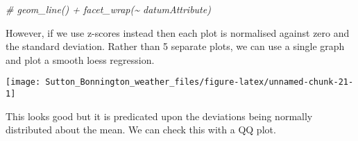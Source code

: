 \documentclass{article}
\newenvironment{Shaded}{\begin{snugshade}}{\end{snugshade}}
\newcommand{\AttributeTok}[1]{\textcolor[rgb]{0.77,0.63,0.00}{#1}}
\newcommand{\CommentTok}[1]{\textcolor[rgb]{0.56,0.35,0.01}{\textit{#1}}}
\newcommand{\ConstantTok}[1]{\textcolor[rgb]{0.00,0.00,0.00}{#1}}
\newcommand{\FunctionTok}[1]{\textcolor[rgb]{0.00,0.00,0.00}{#1}}
\newcommand{\NormalTok}[1]{#1}
\newcommand{\OtherTok}[1]{\textcolor[rgb]{0.56,0.35,0.01}{#1}}
\newcommand{\SpecialCharTok}[1]{\textcolor[rgb]{0.00,0.00,0.00}{#1}}
\newcommand{\StringTok}[1]{\textcolor[rgb]{0.31,0.60,0.02}{#1}}
\begin{document}
\begin{Shaded}
\begin{Highlighting}[]
 \CommentTok{\#   geom\_line() + facet\_wrap(\textasciitilde{} datumAttribute)}
\end{Highlighting}
\end{Shaded}

However, if we use z-scores instead then each plot is normalised against zero and the standard deviation. Rather than 5 separate plots, we can use a single graph and plot a smooth loess regression.

\begin{Shaded}
\end{Shaded}

\begin{center}\texttt{[image: Sutton\_Bonnington\_weather\_files/figure-latex/unnamed-chunk-21-1]} \end{center}

This looks good but it is predicated upon the deviations being normally distributed about the mean. We can check this with a QQ plot.
\end{document}
